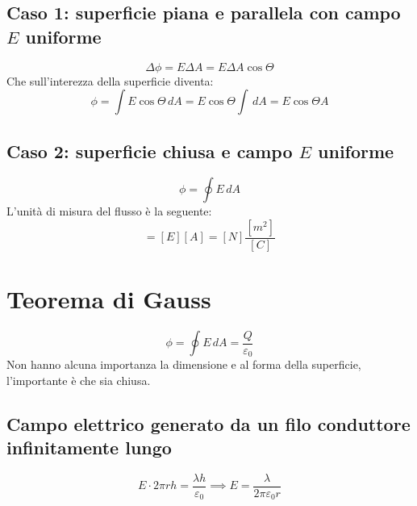             \subsection*{Caso 1: superficie piana e parallela con campo $E$
            uniforme}
                \begin{equation*}
                    \Delta\phi = E \Delta A = E \Delta A \cos\Theta 
                \end{equation*}
            Che sull'interezza della superficie diventa:
                \begin{equation*}
                \phi = \int E\cos\Theta \,dA  = E\cos\Theta\int\,dA = E\cos
                \Theta A 
                \end{equation*}
            \subsection*{Caso 2: superficie chiusa e campo $E$ uniforme}
                \begin{equation*}
                    \phi = \oint E \,dA
                \end{equation*}
        L'unità di misura del flusso è la seguente:
                \begin{equation*}
                    [\phi] = [E][A] = [N] \frac{[m^2]}{[C]}
                \end{equation*}
         
        \section*{Teorema di Gauss}
            \begin{equation*}
                \phi = \oint E \, dA = \frac{Q}{\varepsilon_0}
            \end{equation*}
        Non hanno alcuna importanza la dimensione e al forma della superficie,
        l'importante è che sia chiusa.

            \subsection*{Campo elettrico generato da un filo conduttore 
            infinitamente lungo}
                \begin{equation*}
                    E \cdot 2\pi rh = \frac{\lambda h}{\varepsilon_0}
                    \implies
                    E = \frac{\lambda}{2\pi\varepsilon_0r}
                \end{equation*}

